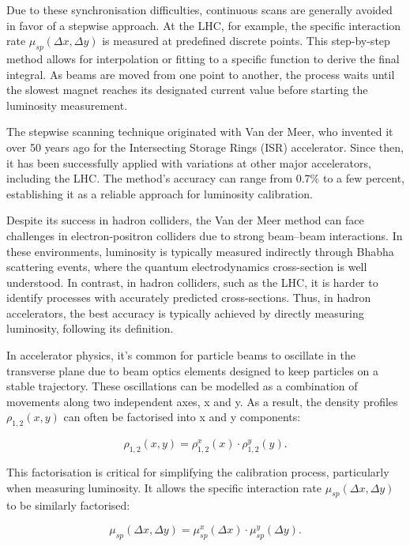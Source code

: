 Due to these synchronisation difficulties, continuous scans are generally avoided in favor of a stepwise approach. At the LHC, for example, the specific interaction rate $\mu_{sp}(\Delta x,\Delta y)$ is measured at predefined discrete points. This step-by-step method allows for interpolation or fitting to a specific function to derive the final integral. As beams are moved from one point to another, the process waits until the slowest magnet reaches its designated current value before starting the luminosity measurement.

The stepwise scanning technique originated with Van der Meer, who invented it over 50 years ago for the Intersecting Storage Rings (ISR) accelerator\cite{Carboni:156499}. Since then, it has been successfully applied with variations at other major accelerators\cite{Rubbia:1025746}, including the LHC. The method's accuracy can range from 0.7\% to a few percent, establishing it as a reliable approach for luminosity calibration.

Despite its success in hadron colliders, the Van der Meer method can face challenges in electron-positron colliders due to strong beam–beam interactions. In these environments, luminosity is typically measured indirectly through Bhabha scattering events, where the quantum electrodynamics cross-section is well understood. In contrast, in hadron colliders, such as the LHC, it is harder to identify processes with accurately predicted cross-sections. Thus, in hadron accelerators, the best accuracy is typically achieved by directly measuring luminosity, following its definition.

In accelerator physics, it's common for particle beams to oscillate in the transverse plane due to beam optics elements designed to keep particles on a stable trajectory. These oscillations can be modelled as a combination of movements along two independent axes, x and y. As a result, the density profiles \(\rho _{1,2}(x, y)\) can often be factorised into x and y components:

\begin{equation}
\rho _{1,2}(x, y) = \rho _{1,2}^x(x) \cdot \rho _{1,2}^y(y).
\end{equation}

This factorisation is critical for simplifying the calibration process, particularly when measuring luminosity. It allows the specific interaction rate \(\mu_{sp}(\Delta x, \Delta y)\) to be similarly factorised:

\begin{equation}
\mu _{sp}(\Delta x, \Delta y) = \mu ^x_{sp}(\Delta x) \cdot \mu ^y_{sp}(\Delta y).
\end{equation}


